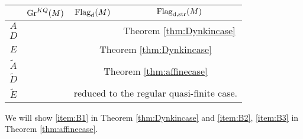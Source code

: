 \begingroup
\renewcommand{\arraystretch}{1.3}
\begin{table}[ht]
\centering
\vspace{0.5cm}
\begin{tabular}{|c|c|c|c|}
\hline
            & $\operatorname{Gr}^{KQ}(M)$                  & $\operatorname{\operatorname{Flag}_{d}}(M)$                          & $\operatorname{\operatorname{Flag}_{d,\operatorname{str}}}(M)$          \\ \hline
$A$         & \multirow{3}{*}{\cite[Section 5]{irelli2019cell}} & \multirow{2}{*}{\cite[Theorem 2.20]{maksimau2019flag}}        & \multirow{2}{*}{Theorem \ref{thm:Dynkincase}}       \\ \cline{1-1}
$D$         &                            &                                      &                         \\ \cline{1-1} \cline{3-4} 
$E$         &                            & \multicolumn{2}{c|}{Theorem \ref{thm:Dynkincase}}                                          \\ \hline
$\tilde{A}$ & \multirow{3}{*}{\cite[Section 6]{irelli2019cell}} & \multicolumn{2}{c|}{\multirow{2}{*}{Theorem \ref{thm:affinecase}}}                         \\ \cline{1-1}
$\tilde{D}$ &                            & \multicolumn{2}{c|}{}                                          \\ \cline{1-1} \cline{3-4} 
$\tilde{E}$ &                            & \multicolumn{2}{c|}{reduced to the regular quasi-finite case.} \\ \hline
\end{tabular}
\vspace{1mm}
\caption[Current progress in affine pavings]{}
\label{table:result}
\end{table}
\endgroup
We will show \eqref{item:B1} in Theorem \ref{thm:Dynkincase} and \eqref{item:B2}, \eqref{item:B3} in Theorem \ref{thm:affinecase}.

$\,$

